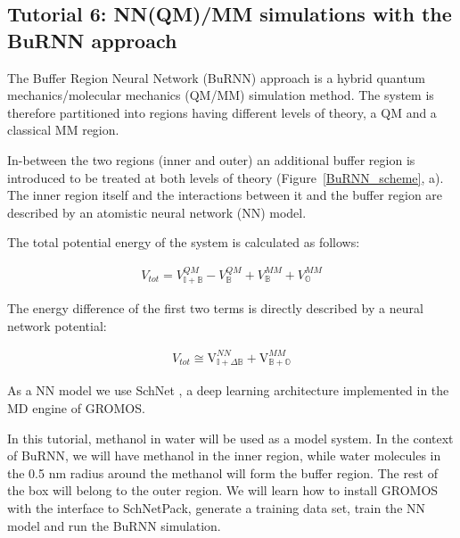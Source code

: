 
\subsection{Tutorial 6: NN(QM)/MM simulations with the BuRNN approach}
The Buffer Region Neural Network (BuRNN) approach \cite{Lier2022BuRNN} is a hybrid quantum mechanics/molecular mechanics (QM/MM) \cite{Warshel1976QM/MM, Senn2009QM/MM} simulation method. The system is therefore partitioned into regions having different levels of theory, a QM and a classical MM region. 

In-between the two regions (inner and outer) an additional buffer region is introduced to be treated at both levels of theory (Figure~\ref{BuRNN_scheme}, a). The inner region itself and the interactions between it and the buffer region are described by an atomistic neural network (NN) model.

The total potential energy of the system is calculated as follows:

\begin{equation}
  \begin{aligned}
  V_{tot} = V^{QM}_{\mathbb{I+B}} - V^{QM}_{\mathbb{B}} + V^{MM}_{\mathbb{B}} + V^{MM}_{\mathbb{O}}
    \end{aligned}
\end{equation}

 The energy difference of the first two terms is directly described by a neural network potential: 
 
\begin{equation}
  \begin{aligned}
  V_{tot} \cong \mathrm{V}_{\mathbb{I+}\Delta\mathbb{B}}^{NN} + \mathrm{V}_{\mathbb{B+O}}^{MM}
    \end{aligned}
\end{equation}

 As a NN model we use SchNet \cite{Schuett2017SchNet, Schuett2018SchNet,Schuett2019SPK}, a deep learning architecture implemented in the MD engine of GROMOS.
 
In this tutorial, methanol in water will be used as a model system. In the context of BuRNN, we will have methanol in the inner region, while water molecules in the 0.5 nm radius around the methanol will form the buffer region. The rest of the box will belong to the outer region. We will learn how to install GROMOS with the interface to SchNetPack, generate a training data set, train the NN model and run the BuRNN simulation.

